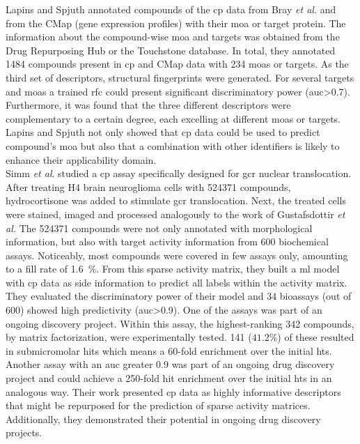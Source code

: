 Lapins and Spjuth\cite{Lapins2019} annotated compounds of the \ac{cp} data from Bray \textit{et al.}\cite{Bray2017} and from the CMap\cite{Subramanian2017} (gene expression profiles) with their \ac{moa} or target protein. The information about the compound-wise \ac{moa} and targets was obtained from the Drug Repurposing Hub or the Touchstone database. In total, they annotated \num{1484} compounds present in \ac{cp} and CMap data with \num{234} \acp{moa} or targets. As the third set of descriptors, structural fingerprints were generated. For several targets and \acp{moa} a trained \ac{rfc} could present significant discriminatory power (\acs{auc}>\num{0.7}). Furthermore, it was found that the three different descriptors were complementary to a certain degree, each excelling at different \acp{moa} or targets. Lapins and Spjuth not only showed that \ac{cp} data could be used to predict compound's \ac{moa} but also that a combination with other identifiers is likely to enhance their applicability domain.\\
Simm \textit{et al}.\cite{Simm2017} studied a \ac{cp} assay specifically designed for \ac{gcr} nuclear translocation. After treating H4 brain neuroglioma cells with \num{524371} compounds, hydrocortisone was added to stimulate \ac{gcr} translocation. Next, the treated cells were stained, imaged and processed analogously to the work of Gustafsdottir \textit{et al.}\cite{Gustafsdottir2013} The \num{524371} compounds were not only annotated with morphological information, but also with target activity information from \num{600} biochemical assays. Noticeably, most compounds were covered in few assays only, amounting to a fill rate of \SI{1.6}{\percent}. From this sparse activity matrix, they built a \ac{ml} model with \ac{cp} data as side information to predict all labels within the activity matrix. They evaluated the discriminatory power of their model and \num{34} bioassays (out of \num{600}) showed high predictivity (\acs{auc}>\num{0.9}). One of the assays was part of an ongoing discovery project. Within this assay, the highest-ranking \num{342} compounds, by matrix factorization, were experimentally tested. \num{141} ($41.2\%$) of these resulted in submicromolar hits which means a \num{60}-fold enrichment over the initial \ac{hts}. Another assay with an \ac{auc} greater \num{0.9} was part of an ongoing drug discovery project and could achieve a \num{250}-fold hit enrichment over the initial \ac{hts} in an analogous way. Their work presented \ac{cp} data as highly informative descriptors that might be repurposed for the prediction of sparse activity matrices. Additionally, they demonstrated their potential in ongoing drug discovery projects.\cite{Simm2018}\\
